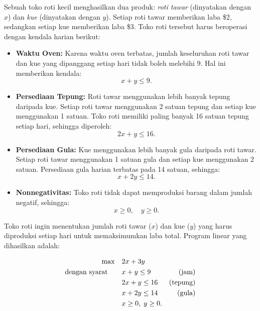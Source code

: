 Sebuah toko roti kecil menghasilkan dua produk: \emph{roti tawar} (dinyatakan dengan \(x\)) dan \emph{kue} (dinyatakan dengan \(y\)). Setiap roti tawar memberikan laba \$2, sedangkan setiap kue memberikan laba \$3. Toko roti tersebut harus beroperasi dengan kendala harian berikut:

\begin{itemize}
    \item \textbf{Waktu Oven:} Karena waktu oven terbatas, jumlah keseluruhan roti tawar dan kue yang dipanggang setiap hari tidak boleh melebihi 9. Hal ini memberikan kendala:
    \[
    x + y \leq 9.
    \]
    
    \item \textbf{Persediaan Tepung:} Roti tawar menggunakan lebih banyak tepung daripada kue. Setiap roti tawar menggunakan 2 satuan tepung dan setiap kue menggunakan 1 satuan. Toko roti memiliki paling banyak 16 satuan tepung setiap hari, sehingga diperoleh:
    \[
    2x + y \leq 16.
    \]
    
    \item \textbf{Persediaan Gula:} Kue menggunakan lebih banyak gula daripada roti tawar. Setiap roti tawar menggunakan 1 satuan gula dan setiap kue menggunakan 2 satuan. Persediaan gula harian terbatas pada 14 satuan, sehingga:
    \[
    x + 2y \leq 14.
    \]

    \item \textbf{Nonnegativitas:} Toko roti tidak dapat memproduksi barang dalam jumlah negatif, sehingga:
    \[
    x \geq 0, \quad y \geq 0.
    \]
\end{itemize}


Toko roti ingin menentukan jumlah roti tawar (\(x\)) dan kue (\(y\)) yang harus diproduksi setiap hari untuk memaksimumkan laba total. Program linear yang dihasilkan adalah:

\begin{tcolorbox}[colback=orange!5!white, colframe=orange!75!black,    
    width=0.6\textwidth, %
    box align=center, 
    title=\textbf{Program Linear Awal}]
\[
\begin{aligned}
\max \quad & 2x + 3y \\
\mbox{dengan syarat}\quad \quad 
& x + y \leq 9  & \mbox{(jam)}\\
& 2x + y \leq 16  & \mbox{(tepung)}\\
& x + 2y \leq 14 & \mbox{(gula)}\\
& x \geq 0,\; y \geq 0.
\end{aligned}
\]
\end{tcolorbox}

